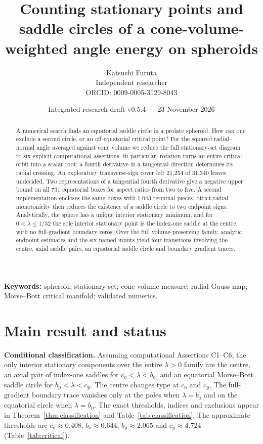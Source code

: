 \documentclass[11pt,a4paper]{article}
\title{Counting stationary points and saddle circles of a cone-volume-weighted angle energy on spheroids}
\author{Katsushi Furuta\\Independent researcher\\\small ORCID: 0009-0005-3129-8043}
\date{Integrated research draft v0.5.4 --- 23 November 2026}
\numberwithin{equation}{section}
\theoremstyle{definition}
\theoremstyle{remark}
\newcommand{\cO}{c_{\mathrm o}}
\newcommand{\bO}{b_{\mathrm o}}
\newcommand{\cP}{c_{\mathrm p}}
\newcommand{\bP}{b_{\mathrm p}}
\begin{document}
\maketitle
\begin{abstract}
A numerical search finds an equatorial saddle circle in a prolate spheroid. How can one exclude a second circle, or an off-equatorial critical point? For the squared radial--normal angle averaged against cone volume we reduce the full stationary-set diagram to six explicit computational assertions. In particular, rotation turns an entire critical orbit into a scalar root; a fourth derivative in a tangential direction determines its radial crossing. An exploratory transverse-sign cover left 21,254 of 31,340 leaves undecided. Two representations of a tangential fourth derivative give a negative upper bound on all 731 equatorial boxes for aspect ratios from two to five. A second implementation encloses the same boxes with 1,043 terminal pieces. Strict radial monotonicity then reduces the existence of a saddle circle to two endpoint signs. Analytically, the sphere has a unique interior stationary minimum, and for $0<\lambda\le 1/32$ the sole interior stationary point is the index-one saddle at the centre, with no full-gradient boundary zeros. Over the full volume-preserving family, analytic endpoint estimates and the six named inputs yield four transitions involving the centre, axial saddle pairs, an equatorial saddle circle and boundary gradient traces.
\end{abstract}
\noindent\textbf{Keywords:} spheroid; stationary set; cone volume measure; radial Gauss map; Morse--Bott critical manifold; validated numerics.

\section*{Main result and status}
\noindent\textbf{Conditional classification.}
Assuming computational Assertions C1--C6, the only interior stationary
components over the entire $\lambda>0$ family are the centre, an axial pair
of index-one saddles for $\cO<\lambda<\bO$, and an equatorial
Morse--Bott saddle circle for $\bP<\lambda<\cP$.
The centre changes type at $\cO$ and $\cP$.
The full-gradient boundary trace vanishes only at the poles when
$\lambda=\bO$ and on the equatorial circle when $\lambda=\bP$.
The exact thresholds, indices and exclusions appear in
Theorem~\ref{thm:classification} and Table~\ref{tab:classification}.
The approximate thresholds are $\cO\approx0.408$, $\bO\approx0.644$,
$\bP\approx2.065$ and $\cP\approx4.724$ (Table~\ref{tab:critical}).
\end{document}
